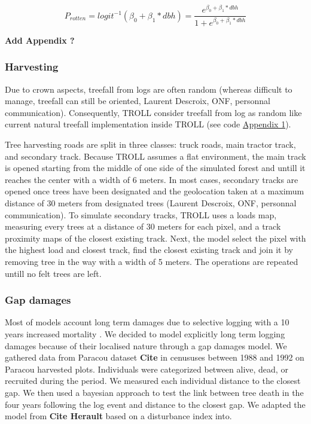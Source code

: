 \documentclass[12pt,]{article}
\theoremstyle{definition}
\theoremstyle{definition}
\theoremstyle{remark}
\begin{document}
\begin{equation}
  P_{rotten} = logit^{-1}(\beta_0 + \beta_1*dbh) = \frac{e^{\beta_0 + \beta_1*dbh}}{1 + e^{\beta_0 + \beta_1*dbh}}
  \label{eq:rotten}
\end{equation}

\textbf{Add Appendix ?}

\subsubsection{Harvesting}\label{harvesting}

Due to crown aspects, treefall from logs are often random (whereas
difficult to manage, treefall can still be oriented, Laurent Descroix,
ONF, personnal communication). Consequently, TROLL consider treefall
from log as random like current natural treefall implementation inside
TROLL (see code \protect\hyperlink{appendix-1}{Appendix 1}).

Tree harvesting roads are split in three classes: truck roads, main
tractor track, and secondary track. Because TROLL assumes a flat
environment, the main track is opened starting from the middle of one
side of the simulated forest and untill it reaches the center with a
width of 6 meters. In most cases, secondary tracks are opened once trees
have been designated and the geolocation taken at a maximum distance of
30 meters from designated trees (Laurent Descroix, ONF, personnal
communication). To simulate secondary tracks, TROLL uses a loads map,
measuring every trees at a distance of 30 meters for each pixel, and a
track proximity maps of the closest existing track. Next, the model
select the pixel with the highest load and closest track, find the
closest existing track and join it by removing tree in the way with a
width of 5 meters. The operations are repeated untill no felt trees are
left.

\subsubsection{Gap damages}\label{gap-damages}

Most of models account long term damages due to selective logging with a
10 years increased mortality \citep{Huth2004, Khler2004, Ruger2008}. We
decided to model explicitly long term logging damages because of their
localised nature through a gap damages model. We gathered data from
Paracou dataset \textbf{Cite} in cenususes between 1988 and 1992 on
Paracou harvested plots. Individuals were categorized between alive,
dead, or recruited during the period. We measured each individual
distance to the closest gap. We then used a bayesian approach to test
the link between tree death in the four years following the log event
and distance to the closest gap. We adapted the model from \textbf{Cite
Herault} based on a disturbance index into.
\end{document}
